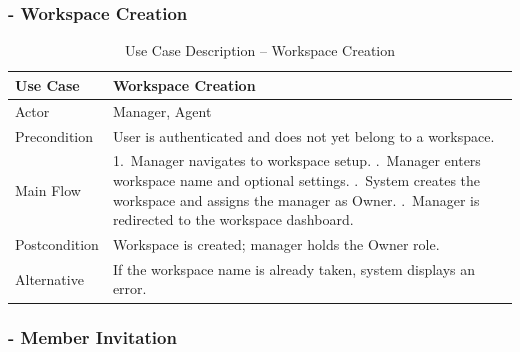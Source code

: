 \documentclass[12pt,a4paper]{report}
\newcommand{\reporttablesetup}{%
  \small%
  \setlength{\tabcolsep}{5pt}%
  \renewcommand{\arraystretch}{1.38}%
  \arrayrulecolor{framegray}%
}
\begin{document}
\subsubsection{- Workspace Creation}

\begin{table}[H]
  \centering
  \renewcommand{\arraystretch}{1.3}
  \reporttablesetup
  \begin{tabularx}{\textwidth}{|p{3.1cm}|Y|}
    \hline
    Use Case      & Workspace Creation \\
    \hline
    Actor         & Manager, Agent \\
    \hline
    Precondition  & User is authenticated and does not yet belong to a workspace. \\
    \hline
    Main Flow     & 1.\ Manager navigates to workspace setup. .\ Manager enters workspace name and optional settings. .\ System creates the workspace and assigns the manager as Owner. .\ Manager is redirected to the workspace dashboard. \\
    \hline
    Postcondition & Workspace is created; manager holds the Owner role. \\
    \hline
    Alternative   & If the workspace name is already taken, system displays an error. \\
    \hline
  \end{tabularx}
  \caption{Use Case Description -- Workspace Creation}
  \label{tab:uc02}
\end{table}

\subsubsection{- Member Invitation}
\end{document}
